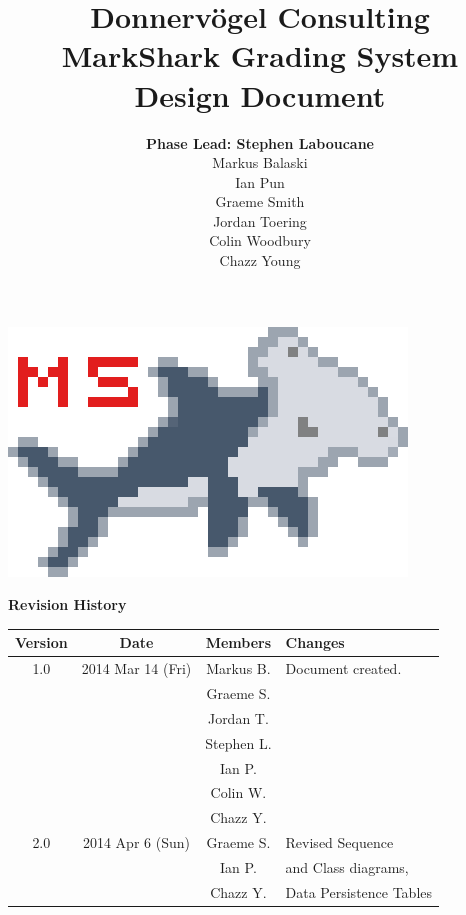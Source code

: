 \documentclass{article}
\begin{document}
\title{Donnervögel Consulting \\ MarkShark Grading System \\ Design Document}
\author{\textbf{Phase Lead: Stephen Laboucane} \\ Markus Balaski \\ Ian Pun \\
  Graeme Smith \\ Jordan Toering \\  Colin Woodbury \\ Chazz Young}
\maketitle
\centerline{\includegraphics{../images/logo/markshark-10x}}
\clearpage

\textbf{Revision History}
\begin{center}
  \begin{tabular}{| c | c | c | l |}
    \hline
    Version & Date & Members & Changes\\
    \hline
    1.0 & 2014 Mar 14 (Fri) & Markus B. & Document created.\\
    & & Graeme S. & \\
    & & Jordan T. & \\
    & & Stephen L. & \\
    & & Ian P. & \\
    & & Colin W. & \\
    & & Chazz Y. & \\
    \hline
    2.0 & 2014 Apr 6 (Sun) & Graeme S. & Revised Sequence\\
    & & Ian P. & and Class diagrams,\\
    & & Chazz Y. & Data Persistence Tables\\
    \hline
  \end{tabular}
\end{center}
\clearpage
\end{document}
